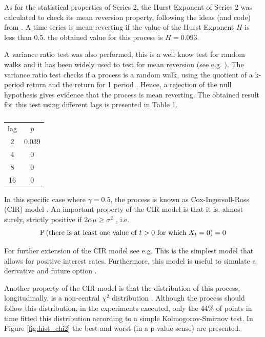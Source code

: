 \documentclass[11pt]{article}
\theoremstyle{definition}
\theoremstyle{remark}
\theoremstyle{remark}
\begin{document}
As for the statistical properties of Series 2, the Hurst Exponent of Series 2
was calculated to check its mean reversion property, following the ideas
(and code) from \parencite{quanstart}. A time series is mean reverting if the value
of the Hurst Exponent $H$ is less than 0.5. the obtained value for this process
is $H = 0.093$.

A variance ratio test was also performed, this is a well know test for random
walks \parencite{lo1989size} and it has been widely used to test for mean
reversion (see e.g. \parencite{lo1988stock,risager1998random,lam2006new}).
The variance ratio test checks if a process is a random walk,
using the quotient of a k-period return and the return for 1 period
\parencite{charles2009variance}. Hence, a rejection of the null hypothesis
gives evidence that the process is mean reverting. The obtained result for
this test using different lags is presented in Table \ref{tab:vrt2}.

\begin{table}[t]
  \centering
  \begin{tabular}{cc}
    \hline
    lag & $p$   \\
    2   & 0.039 \\
    4   & 0     \\
    8   & 0     \\
    16  & 0     \\ \hline
  \end{tabular}
  \caption{}
  \label{tab:vrt2}
\end{table}

In this specific case where $\gamma=0.5$, the process is known as
Cox-Ingersoll-Ross (CIR) model \parencite{cox1985}. An important property
of the CIR model is that it is, almost surely, strictly positive
if $2\alpha\mu \ge \sigma^2$ \parencite{cox1985,unknown2017}, i.e.
\begin{equation*}
  \P{\text{there is at least one value of } t > 0 \text{ for which }
    X_t = 0} = 0
\end{equation*}

For further extension of the CIR model see e.g.
\parencite{overbeck1997estimation,mishra2010study,li2015asymptotic,medvedev2019cox}
This is the simplest model that allows for positive interest
rates. Furthermore, this model is useful to simulate a derivative and
future option \parencite{unknown2017}.

Another property of the CIR model is that the distribution of this process,
longitudinally, is a non-central $\chi^2$ distribution
\parencite{dyrting2004}. Although the process should follow this
distribution, in the experiments executed, only the 44\% of points in
time fitted this distribution according to a simple Kolmogorov-Smirnov test.
In Figure \ref{fig:hist_chi2} the best and worst (in a p-value sense) are presented.
\end{document}
